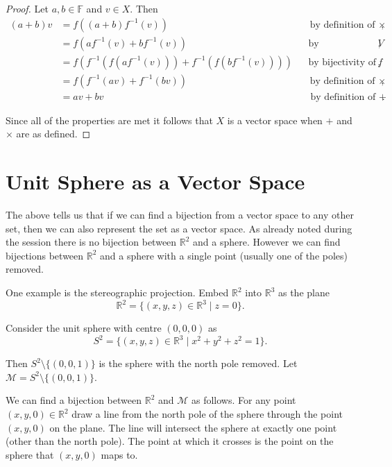 \documentclass[10pt, a4paper]{article}
\def\R{\mathbb{R}}
\def\F{\mathbb{F}}
\def\setsep{\mid}
\def\f{f}
\def\finv{f^{-1}}
\theoremstyle{break}
\begin{document}
\begin{proof}
Let $a, b \in \F$ and $v \in X$. Then
\begin{align*}
(a + b) v & = \f((a + b) \finv(v)) && \text{by definition of $\times$}, \\
          & = \f( a \finv(v) + b \finv(v)) && \text{by distributivity in $V$}, \\
          & = \f( \finv( \f(a \finv(v))) + \finv( \f( b \finv(v)))) && \text{by bijectivity of $\f$}, \\
          & = \f( \finv(av) + \finv(bv)) && \text{by definition of $\times$}, \\
          & = av + bv && \text{by definition of $+$}.
\end{align*}

Since all of the properties are met it follows that $X$ is a vector space when $+$ and $\times$ are as defined.
\end{proof}

\section*{Unit Sphere as a Vector Space}

The above tells us that if we can find a bijection from a vector space to any other set, then we can also represent the set as a vector space. As already noted during the session there is no bijection between $\R^2$ and a sphere. However we can find bijections between $\R^2$ and a sphere with a single point (usually one of the poles) removed.

One example is the stereographic projection. Embed $\R^2$ into $\R^3$ as the plane
$$
\R^2 = \{ (x, y, z) \in \R^3 \setsep z = 0 \}.
$$

Consider the unit sphere with centre $(0, 0, 0)$ as
$$
S^2 = \{ (x, y, z) \in \R^3 \setsep x^2 + y^2 + z^2 = 1 \}.
$$

Then $S^2 \setminus \{ (0, 0, 1) \}$ is the sphere with the north pole removed. Let $\mathscr{M} = S^2 \setminus \{ (0, 0, 1) \}$.

We can find a bijection between $\R^2$ and $\mathscr{M}$ as follows. For any point $(x, y, 0) \in \R^2$ draw a line from the north pole of the sphere through the point $(x, y, 0)$ on the plane. The line will intersect the sphere at exactly one point (other than the north pole). The point at which it crosses is the point on the sphere that $(x, y, 0)$ maps to.
\end{document}
